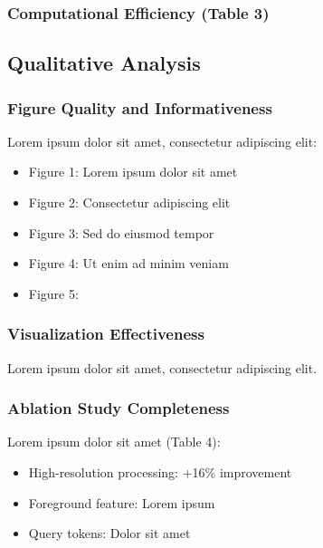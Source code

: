 
\subsubsection{Computational Efficiency (Table 3)}

\subsection{Qualitative Analysis}
\subsubsection{Figure Quality and Informativeness}
Lorem ipsum dolor sit amet, consectetur adipiscing elit:
\begin{itemize}
    \item Figure 1: Lorem ipsum dolor sit amet
    \item Figure 2: Consectetur adipiscing elit
    \item Figure 3: Sed do eiusmod tempor
    \item Figure 4: Ut enim ad minim veniam
    \item Figure 5: 
\end{itemize}

\subsubsection{Visualization Effectiveness}
Lorem ipsum dolor sit amet, consectetur adipiscing elit. 

\subsubsection{Ablation Study Completeness}
Lorem ipsum dolor sit amet (Table 4):
\begin{itemize}
    \item High-resolution processing: +16\% improvement
    \item Foreground feature: Lorem ipsum
    \item Query tokens: Dolor sit amet
\end{itemize}

